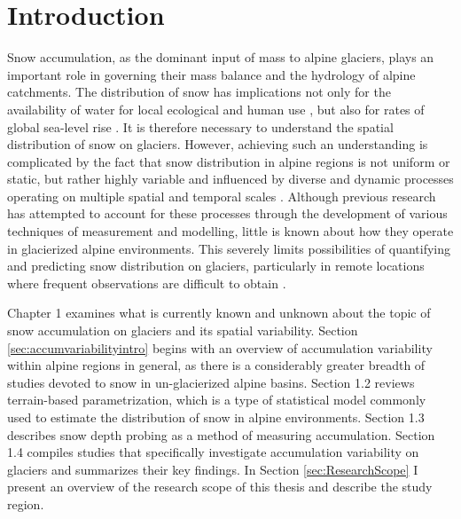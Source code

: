 \documentclass{sfuthesis}
\begin{document}
\tableofcontents\clearpage
{}\listoftables\clearpage
{}\listoffigures






\mainmatter%

\chapter{Introduction}

Snow accumulation, as the dominant input of mass to alpine glaciers, plays an important role in governing their mass balance and the hydrology of alpine catchments. The distribution of snow has implications not only for the availability of water for local ecological and human use \citep{Barnett2005,ONeel2014}, but also for rates of global sea-level rise \citep{Gardner2013}. It is therefore necessary to understand the spatial distribution of snow on glaciers. However, achieving such an understanding is complicated by the fact that snow distribution in alpine regions is not uniform or static, but rather highly variable and influenced by diverse and dynamic processes operating on multiple spatial and temporal scales \citep[e.g.][]{Clark2011}. Although previous research has attempted to account for these processes through the development of various techniques of measurement and modelling, little is known about how they operate in glacierized alpine environments. This severely limits possibilities of quantifying and predicting snow distribution on glaciers, particularly in remote locations where frequent {\color{red} observations are difficult to obtain } \citep[e.g.][]{Nolan2015}.

Chapter 1 examines what is currently known and unknown about the topic of snow accumulation on glaciers and its spatial variability. Section \ref{sec:accumvariabilityintro} begins with an overview of accumulation variability within alpine regions in general, as there is a considerably greater breadth of studies devoted to snow in un-glacierized alpine basins. Section 1.2 reviews terrain-based parametrization, which is a type of statistical model commonly used to estimate the distribution of snow in alpine environments. Section 1.3 describes snow depth probing as a method of measuring accumulation. Section 1.4 compiles studies that specifically investigate accumulation variability on glaciers and summarizes their key findings. In Section \ref{sec:ResearchScope} I present an overview of the research scope of this thesis and describe the study region.
\end{document}
